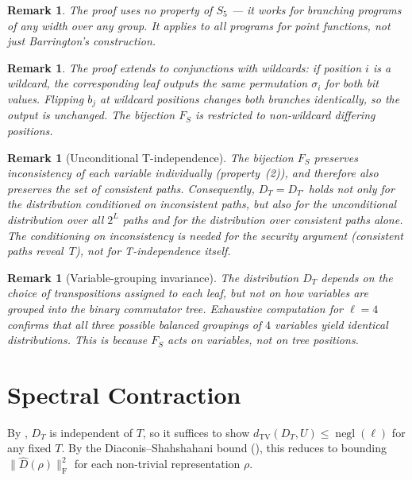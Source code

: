 \documentclass[11pt]{article}
\newtheorem{remark}[theorem]{Remark}
\DeclareMathOperator{\negl}{negl}
\newcommand{\norm}[1]{\lVert #1 \rVert}
\newcommand{\frob}[1]{\norm{#1}_{\mathrm{F}}}
\newcommand{\dtv}{d_{\mathrm{TV}}}
\newcommand{\Dhat}{\widehat{D}}
\begin{document}
\begin{remark}
The proof uses no property of $S_5$ --- it works for branching programs of
any width over any group. It applies to all programs for point functions,
not just Barrington's construction.
\end{remark}

\begin{remark}
The proof extends to conjunctions with wildcards: if position $i$ is a wildcard,
the corresponding leaf outputs the same permutation $\sigma_i$ for both bit values.
Flipping $b_j$ at wildcard positions changes both branches identically, so the output
is unchanged. The bijection $F_S$ is restricted to non-wildcard differing positions.
\end{remark}

\begin{remark}[Unconditional T-independence]
\label{rem:unconditional}
The bijection $F_S$ preserves inconsistency of each variable individually
(property~(2)), and therefore also preserves the set of \emph{consistent}
paths. Consequently, $D_T = D_{T'}$ holds not only for the distribution
conditioned on inconsistent paths, but also for the unconditional distribution
over all $2^L$ paths and for the distribution over consistent paths alone.
The conditioning on inconsistency is needed for the security argument
(consistent paths reveal~$T$), not for T-independence itself.
\end{remark}

\begin{remark}[Variable-grouping invariance]
\label{rem:grouping}
The distribution $D_T$ depends on the choice of transpositions assigned to
each leaf, but \emph{not} on how variables are grouped into the binary
commutator tree. Exhaustive computation for $\ell = 4$ confirms that all
three possible balanced groupings of $4$ variables yield identical distributions.
This is because $F_S$ acts on variables, not on tree positions.
\end{remark}


\section{Spectral Contraction}
\label{sec:contraction}

By , $D_T$ is independent of $T$, so it suffices to show
$\dtv(D_T, U) \leq \negl(\ell)$ for any fixed $T$. By the
Diaconis--Shahshahani bound (), this reduces to bounding
$\frob{\Dhat(\rho)}^2$ for each non-trivial representation $\rho$.
\end{document}
